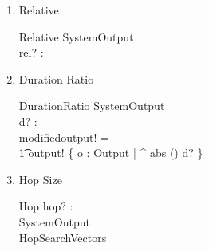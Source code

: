 \documentclass[11pt]{article}
\begin{document}
\begin{enumerate}
\begin{enumerate}
\begin{schema}{Absolute}
	SystemOutput \\
	a? : \R \\
\where
	modifiedoutput! = \\
	\t1 output! \filter \{ o : Output | o.sourcepower \geq  a? \} 
\end{schema}	
	
\item Relative




\begin{schema}{Relative}
	SystemOutput \\
	rel? : \R \\
\end{schema}	

\item Duration Ratio

\begin{schema}{DurationRatio}
	SystemOutput \\
	d? : \R \\
\where
	modifiedoutput! = \\
	\t1 output! \filter \{ o : Output | \exp ^ {abs \ln ()} \leq d?  \} 
\end{schema}	

\item Hop Size 

\begin{schema}{Hop}
	hop? : \nat \\
	SystemOutput \\
	HopSearchVectors \\
\end{schema}

\end{enumerate}
\end{enumerate}
\end{document}
